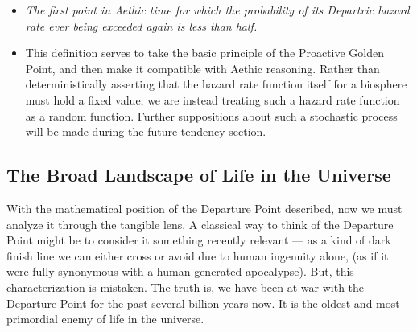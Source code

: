 \begin{itemize}
\begin{itemize}
        \item \textit{The first point in Aethic time for which the probability of its Departric hazard rate ever being exceeded again is less than half.}
        \label{expect Gold}
        \item This definition serves to take the basic principle of the Proactive Golden Point, and then make it compatible with Aethic reasoning. Rather than deterministically asserting that the hazard rate function itself for a biosphere must hold a fixed value, we are instead treating such a hazard rate function as a random function. Further suppositions about such a stochastic process will be made during the \hyperref[stochastic analysis]{future tendency section}.
    \end{itemize}
\end{itemize}

\subsection{The Broad Landscape of Life in the Universe}

With the mathematical position of the Departure Point described, now we must analyze it through the tangible lens. A classical way to think of the Departure Point might be to consider it something recently relevant — as a kind of dark finish line we can either cross or avoid due to human ingenuity alone, (as if it were fully synonymous with a human-generated apocalypse). But, this characterization is mistaken. The truth is, we have been at war with the Departure Point for the past several billion years now. It is the oldest and most primordial enemy of life in the universe. 

